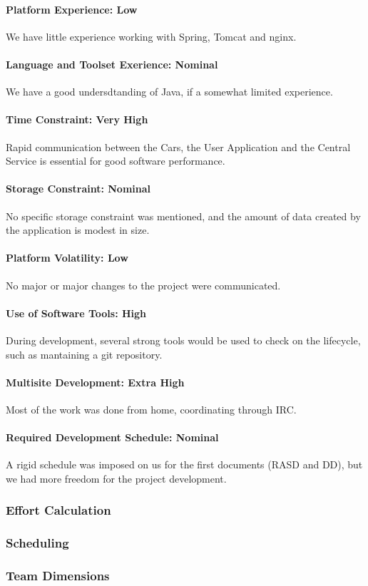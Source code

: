 \paragraph*{Platform Experience: Low}
We have little experience working with Spring, Tomcat and nginx.

\paragraph*{Language and Toolset Exerience: Nominal}
We have a good undersdtanding of Java, if a somewhat limited experience.

\paragraph*{Time Constraint: Very High}
Rapid communication between the Cars, the User Application and the Central Service is essential for good software performance.

\paragraph*{Storage Constraint: Nominal}
No specific storage constraint was mentioned, and the amount of data created by the application is modest in size.

\paragraph*{Platform Volatility: Low}
No major or major changes to the project were communicated.

\paragraph*{Use of Software Tools: High}
During development, several strong tools would be used to check on the lifecycle, such as mantaining a git repository.

\paragraph*{Multisite Development: Extra High}
Most of the work was done from home, coordinating through IRC.

\paragraph*{Required Development Schedule: Nominal}
A rigid schedule was imposed on us for the first documents (RASD and DD), but we had more freedom for the project development.

\subsubsection{Effort Calculation}

\subsubsection{Scheduling}

\subsubsection{Team Dimensions}